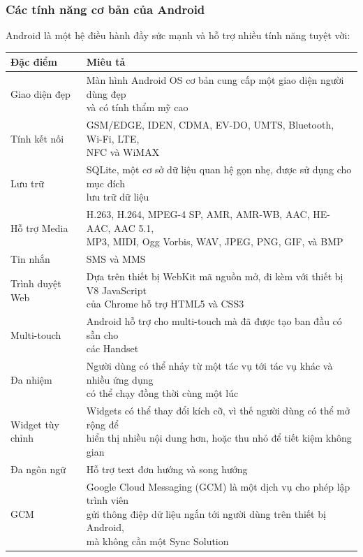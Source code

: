 \documentclass[a4paper]{article}
\begin{document}
\subsubsection{Các tính năng cơ bản của Android}
Android là một hệ điều hành đầy sức mạnh và hỗ trợ nhiều tính năng tuyệt vời:
\begin{table}[h]
\centering
\begin{tabular}{|l|l|}
\hline
\rowcolor[HTML]{C0C0C0} 
\textbf{Đặc điểm} & \textbf{Miêu tả} \\[5pt] \hline
Giao diện đẹp & \pbox{24cm}{Màn hình Android OS cơ bản cung cấp một giao diện người dùng đẹp \\và có tính thẩm mỹ cao} \\[5pt] \hline
Tính kết nối & \pbox{24cm}{GSM/EDGE, IDEN, CDMA, EV-DO, UMTS, Bluetooth, Wi-Fi, LTE,\\ NFC và WiMAX} \\[5pt] \hline
Lưu trữ & \pbox{24cm}{SQLite, một cơ sở dữ liệu quan hệ gọn nhẹ, được sử dụng cho mục đích \\ lưu trữ dữ liệu} \\[5pt] \hline
Hỗ trợ Media & \pbox{24cm}{H.263, H.264, MPEG-4 SP, AMR, AMR-WB, AAC, HE-AAC, AAC 5.1,\\ MP3, MIDI, Ogg Vorbis, WAV, JPEG, PNG, GIF, và BMP} \\[5pt] \hline
Tin nhắn & SMS và MMS \\[5pt] \hline
Trình duyệt Web & \pbox{24cm}{Dựa trên thiết bị WebKit mã nguồn mở, đi kèm với thiết bị V8 JavaScript \\ của Chrome hỗ trợ HTML5 và CSS3} \\[5pt] \hline
Multi-touch & \pbox{24cm}{Android hỗ trợ cho multi-touch mà đã được tạo ban đầu có sẵn cho \\ các Handset} \\[5pt] \hline
Đa nhiệm & \pbox{24cm}{Người dùng có thể nhảy từ một tác vụ tới tác vụ khác và nhiều ứng dụng\\ có thể chạy đồng thời cùng một lúc} \\[5pt] \hline
Widget tùy chỉnh & \pbox{24cm}{Widgets có thể thay đổi kích cỡ, vì thế người dùng có thể mở rộng để\\ hiển thị nhiều nội dung hơn, hoặc thu nhỏ để tiết kiệm không gian} \\[5pt] \hline
Đa ngôn ngữ & Hỗ trợ text đơn hướng và song hướng \\[5pt] \hline
GCM & \pbox{24cm}{Google Cloud Messaging (GCM) là một dịch vụ cho phép lập trình viên\\ gửi thông điệp dữ liệu ngắn tới người dùng trên thiết bị Android, \\mà không cần một Sync Solution} \\[5pt] \hline

\end{tabular}
\end{table}
\end{document}
